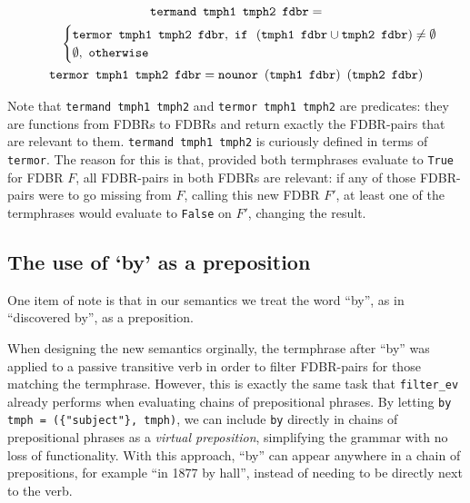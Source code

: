 \documentclass[../main.tex]{subfiles}
\begin{document}
\begin{gather*}
  \mathtt{termand}\enspace \mathtt{tmph1}\enspace \mathtt{tmph2}\enspace \mathtt{fdbr} = \\ \indent\indent
  \begin{cases}
    \mathtt{termor}\enspace \mathtt{tmph1}\enspace \mathtt{tmph2}\enspace \mathtt{fdbr},\ \mathtt{if} \enspace \left(\mathtt{tmph1}\enspace \mathtt{fdbr} \cup
    \mathtt{tmph2}\enspace \mathtt{fdbr}\right) \neq \mathtt{\emptyset} \\
    \emptyset,\ \mathtt{otherwise}
  \end{cases} \\
  \mathtt{termor}\enspace \mathtt{tmph1} \enspace \mathtt{tmph2} \enspace \mathtt{fdbr} = \mathtt{nounor}\enspace (\mathtt{tmph1}\enspace \mathtt{fdbr}) \enspace (\mathtt{tmph2} \enspace \mathtt{fdbr})
\end{gather*}

Note that \texttt{termand tmph1 tmph2} and \texttt{termor tmph1 tmph2} are predicates: they are functions from FDBRs to FDBRs and return exactly the FDBR-pairs
that are relevant to them.  \texttt{termand tmph1 tmph2} is curiously defined in terms of \texttt{termor}.  The reason for this is that, provided both termphrases
evaluate to \texttt{True} for FDBR $F$, all FDBR-pairs in both FDBRs are relevant: if any of those FDBR-pairs were to go missing from $F$, calling this new FDBR $F'$, at least one of 
the termphrases would evaluate to \texttt{False} on $F'$, changing the result.

\subsection{The use of `by' as a preposition}

One item of note is that in our semantics we treat the word ``by'', as in ``discovered by'', as a preposition.

When designing the new semantics orginally, the termphrase after ``by'' was
applied to a passive transitive verb in order to filter FDBR-pairs for those matching
the termphrase.  However, this is exactly the same task that \texttt{filter\_ev} already performs when evaluating chains of prepositional phrases.
By letting \texttt{by tmph = (\{"subject"\}, tmph)}, we can include \texttt{by}
directly in chains of prepositional phrases as a {\em virtual preposition}, simplifying the grammar
with no loss of functionality.  With this approach, ``by'' can appear anywhere in a chain of prepositions, for example ``in 1877 by hall'', instead
of needing to be directly next to the verb.
\end{document}
